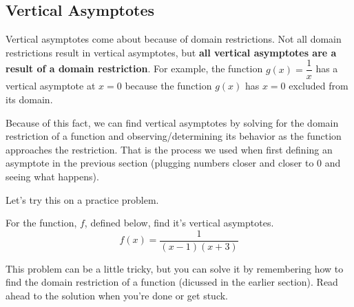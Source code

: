 \clearpage\subsection{Vertical Asymptotes}
Vertical asymptotes come about because of domain restrictions. Not all domain restrictions result in vertical asymptotes, but \textbf{all vertical asymptotes are a result of a domain restriction}. For example, the function $g(x) = \dfrac{1}{x}$ has a vertical asymptote at $x = 0$ because the function $g(x)$ has $x = 0$ excluded from its domain.

Because of this fact, we can find vertical asymptotes by solving for the domain restriction of a function and observing/determining its behavior as the function approaches the restriction. That is the process we used when first defining an asymptote in the previous section (plugging numbers closer and closer to $0$ and seeing what happens).

Let's try this on a practice problem.
\begin{problem}
    For the function, $f$, defined below, find it's vertical asymptotes.
    \[
        f(x) = \frac{1}{(x - 1)(x + 3)}
    \]
\end{problem}
This problem can be a little tricky, but you can solve it by remembering how to find the domain restriction of a function (dicussed in the earlier section). Read ahead to the solution when you're done or get stuck.

